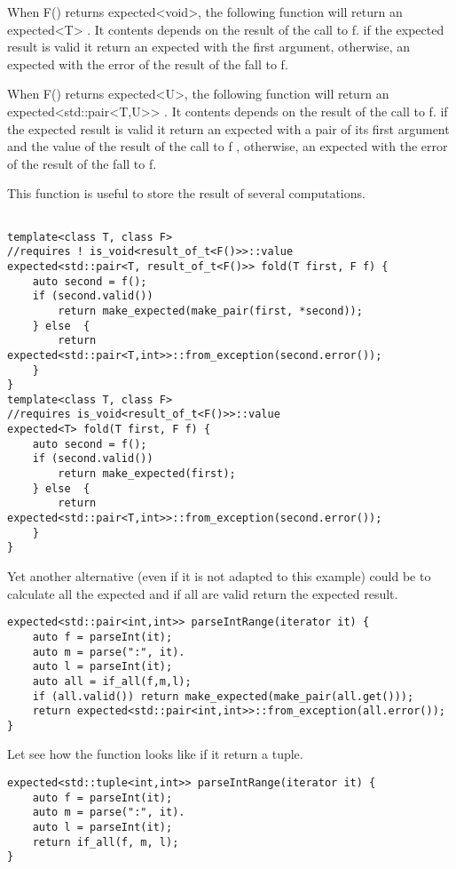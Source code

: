 \documentclass[a4paper,10pt]{article}
\begin{document}
When F() returns expected<void>, the following function will return an expected<T> . It contents depends on the result of the call to f. if the expected result is valid it return an expected with the first argument, otherwise, an expected with the error of the result of the fall to f.  

When F() returns expected<U>, the following function will return an expected<std::pair<T,U>> . It contents depends on the result of the call to f. if the expected result is valid it return an expected with a pair of its first argument and the value of  the result of the call to f , otherwise, an expected with the error of the result of the fall to f.  

This function is useful to store the result of several computations.

\begin{lstlisting}

template<class T, class F>
//requires ! is_void<result_of_t<F()>>::value
expected<std::pair<T, result_of_t<F()>> fold(T first, F f) {
    auto second = f();
    if (second.valid())
        return make_expected(make_pair(first, *second));
    } else  {
        return expected<std::pair<T,int>>::from_exception(second.error());
    }
}
template<class T, class F>
//requires is_void<result_of_t<F()>>::value
expected<T> fold(T first, F f) {
    auto second = f();
    if (second.valid())
        return make_expected(first);
    } else  {
        return expected<std::pair<T,int>>::from_exception(second.error());
    }
}
\end{lstlisting}

Yet another alternative (even if it is not adapted to this example) could be to calculate all the expected and if all are valid return the expected result.

\begin{lstlisting}
expected<std::pair<int,int>> parseIntRange(iterator it) {
    auto f = parseInt(it);
    auto m = parse(":", it).
    auto l = parseInt(it);
    auto all = if_all(f,m,l);
    if (all.valid()) return make_expected(make_pair(all.get()));
    return expected<std::pair<int,int>>::from_exception(all.error());
}
\end{lstlisting}

Let see how the function looks like if it return a tuple.

\begin{lstlisting}
expected<std::tuple<int,int>> parseIntRange(iterator it) {
    auto f = parseInt(it);
    auto m = parse(":", it).
    auto l = parseInt(it);
    return if_all(f, m, l);
}
\end{lstlisting}
\end{document}
